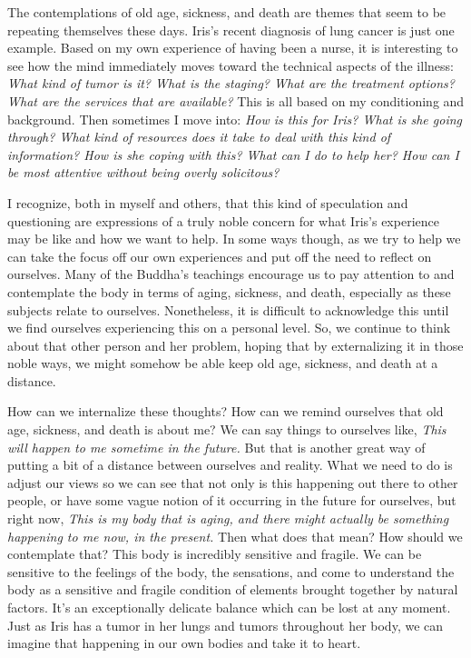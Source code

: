 
The contemplations of old age, sickness, and death are themes that seem 
to be repeating themselves these days. Iris's recent diagnosis of lung 
cancer is just one example. Based on my own experience of having been a 
nurse, it is interesting to see how the mind immediately moves toward 
the technical aspects of the illness: \emph{What kind of tumor is it? 
What is the staging? What are the treatment options? What are the 
services that are available?} This is all based on my conditioning and 
background. Then sometimes I move into: \emph{How is this for Iris? 
What is she going through? What kind of resources does it take to deal 
with this kind of information? How is she coping with this? What can I 
do to help her? How can I be most attentive without being overly 
solicitous?}

I recognize, both in myself and others, that this kind of speculation 
and questioning are expressions of a truly noble concern for what 
Iris's experience may be like and how we want to help. In some ways 
though, as we try to help we can take the focus off our own experiences 
and put off the need to reflect on ourselves. Many of the Buddha's 
teachings encourage us to pay attention to and contemplate the body in 
terms of aging, sickness, and death, especially as these subjects 
relate to ourselves. Nonetheless, it is difficult to acknowledge this 
until we find ourselves experiencing this on a personal level. So, we 
continue to think about that other person and her problem, hoping that 
by externalizing it in those noble ways, we might somehow be able keep 
old age, sickness, and death at a distance.

How can we internalize these thoughts? How can we remind ourselves that 
old age, sickness, and death is about me? We can say things to 
ourselves like, \emph{This will happen to me sometime in the future.} 
But that is another great way of putting a bit of a distance between 
ourselves and reality. What we need to do is adjust our views so we can 
see that not only is this happening out there to other people, or have 
some vague notion of it occurring in the future for ourselves, but 
right now, \emph{This is my body that is aging, and there might 
actually be something happening to me now, in the present.} Then what 
does that mean? How should we contemplate that? This body is incredibly 
sensitive and fragile. We can be sensitive to the feelings of the body, 
the sensations, and come to understand the body as a sensitive and 
fragile condition of elements brought together by natural factors. It's 
an exceptionally delicate balance which can be lost at any moment. Just 
as Iris has a tumor in her lungs and tumors throughout her body, we can 
imagine that happening in our own bodies and take it to heart.

